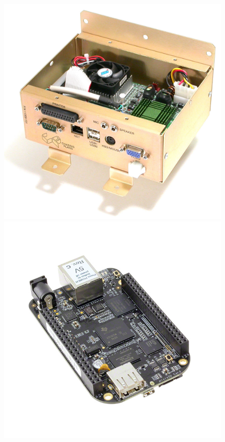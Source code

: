 \documentclass{beamer}
\begin{document}
\begin{frame}
\begin{figure}
    \includegraphics[scale=0.07]{images/accupoll-embedded-computer}\hspace{2em}
    \includegraphics[scale=0.175]{../Body/images/bbb}
  \end{figure}

\end{frame}
\end{document}
